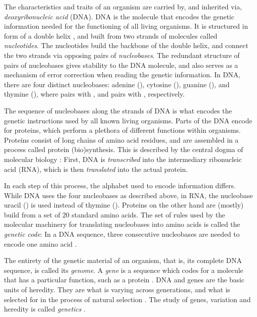 
The characteristics and traits of an organism are carried by, and inherited via, \emph{deoxyribonucleic acid} (DNA).
DNA is the molecule that encodes the genetic information needed for the functioning of all living organisms.
It is structured in form of a double helix \cite{Watson1953},
and built from two strands of molecules called \emph{nucleotides}.
The nucleotides build the backbone of the double helix,
and connect the two strands via opposing pairs of \emph{nucleobases}.
The redundant structure of pairs of nucleobases gives stability to the DNA molecule,
and also serves as a mechanism of error correction when reading the genetic information.
In DNA, there are four distinct nucleobases:
adenine (), cytosine (), guanine (), and thymine (),
where  pairs with , and  pairs with , respectively.

The sequence of nucleobases along the strands of DNA is what encodes the genetic instructions
used by all known living organisms.
Parts of the DNA encode for proteins,
which perform a plethora of different functions within organisms.
Proteins consist of long chains of amino acid residues, and
are assembled in a process called protein (bio)synthesis.
This is described by the central dogma of molecular biology \cite{Crick1958,Crick1970}:
First, DNA is \emph{transcribed} into the intermediary ribonucleic acid (RNA),
which is then \emph{translated} into the actual protein.

In each step of this process, the alphabet used to encode information differs.
While DNA uses the four nucleobases as described above,
in RNA, the nucleobase uracil () is used instead of thymine ().
Proteins on the other hand are (mostly) build from a set of \num{20} standard amino acids.
The set of rules used by the molecular machinery for translating nucleobases into amino acids
is called the \emph{genetic code}:
In a DNA sequence, three consecutive nucleobases are needed to encode one amino acid \cite{Shu2017}.

The entirety of the genetic material of an organism, that is, its complete DNA sequence, is called its \emph{genome}.
A \emph{gene} is a sequence which codes for a molecule that has a particular function, such as a protein \cite{Gericke2007}.
DNA and genes are the basic units of heredity.
They are what is varying across generations,
and what is selected for in the process of natural selection \cite{Dawkins1989}.
The study of genes, variation and heredity is called \emph{genetics} \cite{Griffiths2000}.

